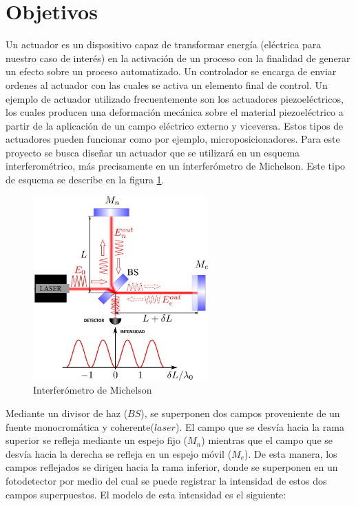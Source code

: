 \section{Objetivos}
\label{sec:objetivos}
Un actuador es un dispositivo capaz de transformar energía (eléctrica para nuestro caso de interés) en la activación de un proceso con la finalidad de generar un efecto sobre un proceso automatizado. Un controlador se encarga de enviar ordenes al actuador con las cuales se activa un elemento final de control. Un ejemplo de actuador utilizado frecuentemente son los actuadores piezoeléctricos, los cuales producen una deformación mecánica sobre el material piezoeléctrico a partir de la aplicación de un campo eléctrico externo y viceversa. Estos tipos de actuadores pueden funcionar como por ejemplo, microposicionadores.
Para este proyecto se busca diseñar un actuador que se utilizará en un esquema interferométrico, más precisamente en un interferómetro de Michelson. Este tipo de esquema se describe en la figura \ref{fig:interferometro}.

\begin{figure}[H]
  \centering
  \includegraphics[width=0.6\textwidth]{images/interferometro_michelson.png}
  \caption{Interferómetro de Michelson}
  \label{fig:interferometro}
\end{figure}

Mediante un divisor de haz ($BS$), se superponen dos campos proveniente de un fuente monocromática y coherente($laser$). El campo que se desvía hacia la rama superior se refleja mediante un espejo fijo ($M_n$) mientras que el campo que se desvía hacia la derecha se refleja en un espejo móvil ($M_e$). De esta manera, los campos reflejados se dirigen hacia la rama inferior, donde se superponen en un fotodetector por medio del cual se puede registrar la intensidad de estos dos campos superpuestos. El modelo de esta intensidad es el siguiente:


